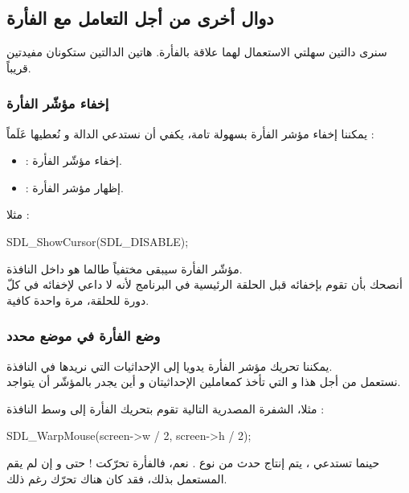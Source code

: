 \subsection{دوال أخرى من أجل التعامل مع الفأرة}

سنرى دالتين سهلتي الاستعمال لهما علاقة بالفأرة. هاتين الدالتين ستكونان مفيدتين قريباً.

\subsubsection{إخفاء مؤشّر الفأرة}

يمكننا إخفاء مؤشر الفأرة بسهولة تامة، يكفي أن نستدعي الدالة
و نُعطيها عَلَماً :

\begin{itemize}
	\item {} :
	إخفاء مؤشّر الفأرة.
	\item {} :
	إظهار مؤشر الفأرة.
\end{itemize}
مثلا :

\begin{Csource}
SDL_ShowCursor(SDL_DISABLE);
\end{Csource}

مؤشّر الفأرة سيبقى مختفياً طالما هو داخل النافذة.\\
أنصحك بأن تقوم بإخفائه قبل الحلقة الرئيسية في البرنامج لأنه لا داعي لإخفائه في كلّ دورة للحلقة، مرة واحدة كافية.

\subsubsection{وضع الفأرة في موضع محدد}

يمكننا تحريك مؤشر الفأرة يدويا إلى الإحداثيات التي نريدها في النافذة.\\
نستعمل من أجل هذا
و التي تأخذ كمعاملين الإحداثيتان
و 
أين يجدر بالمؤشّر أن يتواجد.

مثلا، الشفرة المصدرية التالية تقوم بتحريك الفأرة إلى وسط النافذة :

\begin{Csource}
SDL_WarpMouse(screen->w / 2, screen->h / 2);
\end{Csource}

\begin{information}
حينما تستدعي
،
يتم إنتاج حدث من نوع
.
نعم، فالفأرة تحرّكت ! حتى و إن لم يقم المستعمل بذلك، فقد كان هناك تحرّك رغم ذلك.
\end{information}

